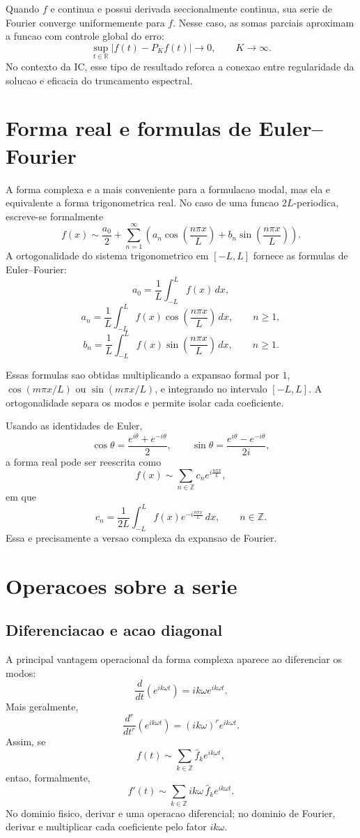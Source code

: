 Quando \(f\) e continua e possui derivada seccionalmente continua, sua serie de
Fourier converge uniformemente para \(f\). Nesse caso, as somas parciais
aproximam a funcao com controle global do erro:
\[
\sup_{t\in\mathbb{R}} |f(t)-P_Kf(t)|\to0,
\qquad K\to\infty.
\]
No contexto da IC, esse tipo de resultado reforca a conexao entre regularidade
da solucao e eficacia do truncamento espectral.

\section{Forma real e formulas de Euler--Fourier}

A forma complexa e a mais conveniente para a formulacao modal, mas ela e
equivalente a forma trigonometrica real. No caso de uma funcao \(2L\)-periodica,
escreve-se formalmente
\[
f(x)\sim
\frac{a_0}{2}
+
\sum_{n=1}^{\infty}
\left(
a_n\cos\left(\frac{n\pi x}{L}\right)
+
b_n\sin\left(\frac{n\pi x}{L}\right)
\right).
\]
A ortogonalidade do sistema trigonometrico em \([-L,L]\) fornece as formulas de
Euler--Fourier:
\[
a_0=\frac{1}{L}\int_{-L}^{L}f(x)\,dx,
\]
\[
a_n=\frac{1}{L}\int_{-L}^{L}
f(x)\cos\left(\frac{n\pi x}{L}\right)\,dx,
\qquad n\geq 1,
\]
\[
b_n=\frac{1}{L}\int_{-L}^{L}
f(x)\sin\left(\frac{n\pi x}{L}\right)\,dx,
\qquad n\geq 1.
\]

Essas formulas sao obtidas multiplicando a expansao formal por \(1\),
\(\cos(m\pi x/L)\) ou \(\sin(m\pi x/L)\), e integrando no intervalo
\([-L,L]\). A ortogonalidade separa os modos e permite isolar cada coeficiente.

Usando as identidades de Euler,
\[
\cos\theta=\frac{e^{i\theta}+e^{-i\theta}}{2},
\qquad
\sin\theta=\frac{e^{i\theta}-e^{-i\theta}}{2i},
\]
a forma real pode ser reescrita como
\[
f(x)\sim \sum_{n\in\mathbb{Z}}c_n e^{i\frac{n\pi x}{L}},
\]
em que
\[
c_n=\frac{1}{2L}\int_{-L}^{L}
f(x)e^{-i\frac{n\pi x}{L}}\,dx,
\qquad n\in\mathbb{Z}.
\]
Essa e precisamente a versao complexa da expansao de Fourier.

\section{Operacoes sobre a serie}

\subsection{Diferenciacao e acao diagonal}

A principal vantagem operacional da forma complexa aparece ao diferenciar os
modos:
\[
\frac{d}{dt}\left(e^{ik\omega t}\right)
=
ik\omega e^{ik\omega t}.
\]
Mais geralmente,
\[
\frac{d^r}{dt^r}\left(e^{ik\omega t}\right)
=
(ik\omega)^r e^{ik\omega t}.
\]
Assim, se
\[
f(t)\sim \sum_{k\in\mathbb{Z}}\widehat f_k e^{ik\omega t},
\]
entao, formalmente,
\[
f'(t)\sim
\sum_{k\in\mathbb{Z}}ik\omega\,\widehat f_k e^{ik\omega t}.
\]
No dominio fisico, derivar e uma operacao diferencial; no dominio de Fourier,
derivar e multiplicar cada coeficiente pelo fator \(ik\omega\).

